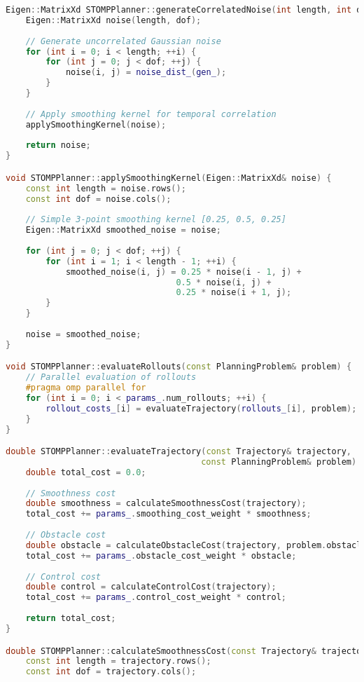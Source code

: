 \begin{lstlisting}[language=C++, caption={STOMP Path Planning Algorithm}, label={lst:app-stomp}]
Eigen::MatrixXd STOMPPlanner::generateCorrelatedNoise(int length, int dof) {
    Eigen::MatrixXd noise(length, dof);
    
    // Generate uncorrelated Gaussian noise
    for (int i = 0; i < length; ++i) {
        for (int j = 0; j < dof; ++j) {
            noise(i, j) = noise_dist_(gen_);
        }
    }
    
    // Apply smoothing kernel for temporal correlation
    applySmoothingKernel(noise);
    
    return noise;
}

void STOMPPlanner::applySmoothingKernel(Eigen::MatrixXd& noise) {
    const int length = noise.rows();
    const int dof = noise.cols();
    
    // Simple 3-point smoothing kernel [0.25, 0.5, 0.25]
    Eigen::MatrixXd smoothed_noise = noise;
    
    for (int j = 0; j < dof; ++j) {
        for (int i = 1; i < length - 1; ++i) {
            smoothed_noise(i, j) = 0.25 * noise(i - 1, j) + 
                                  0.5 * noise(i, j) + 
                                  0.25 * noise(i + 1, j);
        }
    }
    
    noise = smoothed_noise;
}

void STOMPPlanner::evaluateRollouts(const PlanningProblem& problem) {
    // Parallel evaluation of rollouts
    #pragma omp parallel for
    for (int i = 0; i < params_.num_rollouts; ++i) {
        rollout_costs_[i] = evaluateTrajectory(rollouts_[i], problem);
    }
}

double STOMPPlanner::evaluateTrajectory(const Trajectory& trajectory, 
                                       const PlanningProblem& problem) {
    double total_cost = 0.0;
    
    // Smoothness cost
    double smoothness = calculateSmoothnessCost(trajectory);
    total_cost += params_.smoothing_cost_weight * smoothness;
    
    // Obstacle cost
    double obstacle = calculateObstacleCost(trajectory, problem.obstacle_map);
    total_cost += params_.obstacle_cost_weight * obstacle;
    
    // Control cost
    double control = calculateControlCost(trajectory);
    total_cost += params_.control_cost_weight * control;
    
    return total_cost;
}

double STOMPPlanner::calculateSmoothnessCost(const Trajectory& trajectory) {
    const int length = trajectory.rows();
    const int dof = trajectory.cols();
    

\end{lstlisting}
